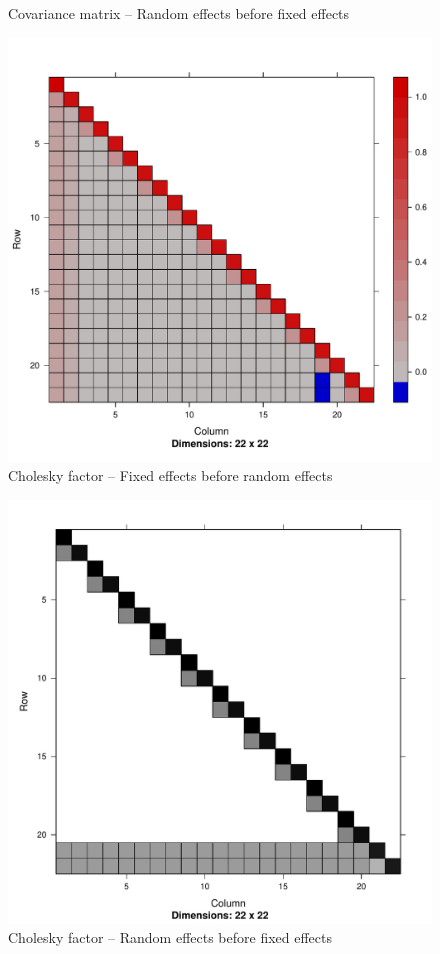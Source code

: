 \documentclass{article}[12pt]
\begin{document}
\begin{itemize}
\begin{figure}
	      		\caption{\tiny Covariance matrix -- Random effects before fixed effects}
	      	\end{figure}
		      				      				      			      			      			      	
	      	\begin{figure}
	      		\includegraphics[scale=.15]{mX_mZ_cholesky.pdf}
	      		\caption{\tiny Cholesky factor -- Fixed effects before random effects}
	      	\end{figure}
	      	\begin{figure}
	      		\includegraphics[scale=.15]{mZ_mX_cholesky.pdf}
	      		\caption{\tiny Cholesky factor -- Random effects before fixed effects}
	      	\end{figure}
	\end{itemize}
		
\end{document}
